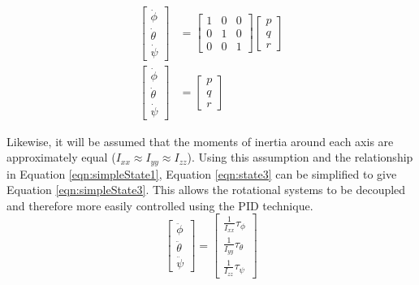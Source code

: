 \begin{equation}\label{eqn:simpleState1}
\begin{split}
\begin{bmatrix}
\dot{\phi}\\ \dot{\theta} \\ \dot{\psi}
\end{bmatrix} 
&=
\begin{bmatrix}
1 & 0 & 0\\
0 & 1 & 0\\
0 & 0 & 1
\end{bmatrix}
\begin{bmatrix}
p\\q\\r
\end{bmatrix} \\
\begin{bmatrix}
\dot{\phi}\\ \dot{\theta} \\ \dot{\psi}
\end{bmatrix} 
&=
\begin{bmatrix}
p\\q\\r
\end{bmatrix}
\end{split}
\end{equation} 




Likewise, it will be assumed that the moments of inertia around each axis are approximately equal ($I_{xx}\approx I_{yy}\approx I_{zz}$). Using this assumption and the relationship in Equation \ref{eqn:simpleState1}, Equation \ref{eqn:state3} can be simplified to give Equation \ref{eqn:simpleState3}. This allows the rotational systems to be decoupled and therefore more easily controlled using the PID technique.
\begin{equation}\label{eqn:simpleState3}
\begin{bmatrix}
\ddot{\phi}\\\ddot{\theta}\\\ddot{\psi}
\end{bmatrix}
=
\begin{bmatrix}
\frac{1}{I_{xx}}\tau_{\phi}\\
\frac{1}{I_{yy}}\tau_{\theta}\\
\frac{1}{I_{zz}}\tau_{\psi}
\end{bmatrix}
\end{equation}


